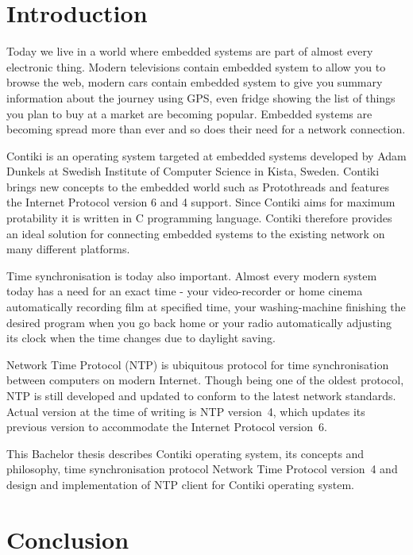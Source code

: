 
\chapter{Introduction}
Today we live in a world where embedded systems are part of almost every electronic thing. Modern televisions
contain embedded system to allow you to browse the web, modern cars contain embedded system to give you summary information
about the journey using GPS, even fridge showing the list of things you plan to buy at a market are becoming popular.
Embedded systems are becoming spread more than ever and so does
their need for a network connection.

Contiki is an operating system targeted at embedded systems
developed by Adam Dunkels at Swedish Institute of Computer Science in Kista, Sweden.
Contiki brings new concepts to the embedded world such as Protothreads and features
the Internet Protocol version 6 and 4 support.
Since Contiki aims for maximum protability it is written in C programming language.
Contiki therefore provides an ideal solution for connecting
embedded systems to the existing network on many different platforms.

Time synchronisation is today also important.
Almost every modern system today has a need for an exact time -
your video-recorder or home cinema automatically recording film at specified time, your washing-machine finishing the
desired program when you go back home or your radio automatically adjusting its clock when the time changes
due to daylight saving.

Network Time Protocol (NTP) is ubiquitous protocol for time synchronisation between computers on modern Internet.
Though being one of the oldest protocol, NTP is still developed and updated to conform to the latest
network standards. Actual version at the time of writing is NTP version~4, which updates its previous version to
accommodate the Internet Protocol version~6.

This Bachelor thesis describes Contiki operating system, its concepts and philosophy, time synchronisation protocol
Network Time Protocol version~4 and design and implementation of NTP client for Contiki operating system.








\chapter{Conclusion}
